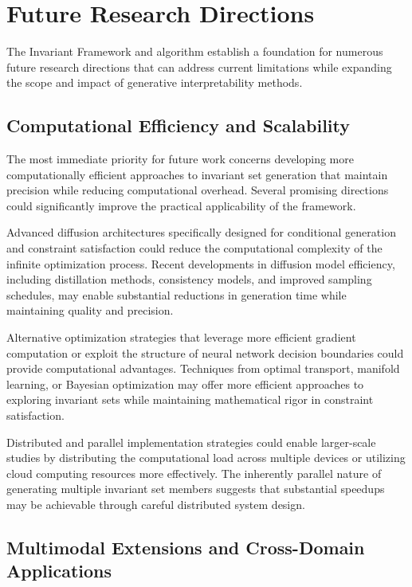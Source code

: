 \section{Future Research Directions}

The Invariant Framework and \method{} algorithm establish a foundation for numerous future research directions that can address current limitations while expanding the scope and impact of generative interpretability methods.

\subsection{Computational Efficiency and Scalability}

The most immediate priority for future work concerns developing more computationally efficient approaches to invariant set generation that maintain precision while reducing computational overhead. Several promising directions could significantly improve the practical applicability of the framework.

Advanced diffusion architectures specifically designed for conditional generation and constraint satisfaction could reduce the computational complexity of the infinite optimization process. Recent developments in diffusion model efficiency, including distillation methods, consistency models, and improved sampling schedules, may enable substantial reductions in generation time while maintaining quality and precision.

Alternative optimization strategies that leverage more efficient gradient computation or exploit the structure of neural network decision boundaries could provide computational advantages. Techniques from optimal transport, manifold learning, or Bayesian optimization may offer more efficient approaches to exploring invariant sets while maintaining mathematical rigor in constraint satisfaction.

Distributed and parallel implementation strategies could enable larger-scale studies by distributing the computational load across multiple devices or utilizing cloud computing resources more effectively. The inherently parallel nature of generating multiple invariant set members suggests that substantial speedups may be achievable through careful distributed system design.

\subsection{Multimodal Extensions and Cross-Domain Applications}

